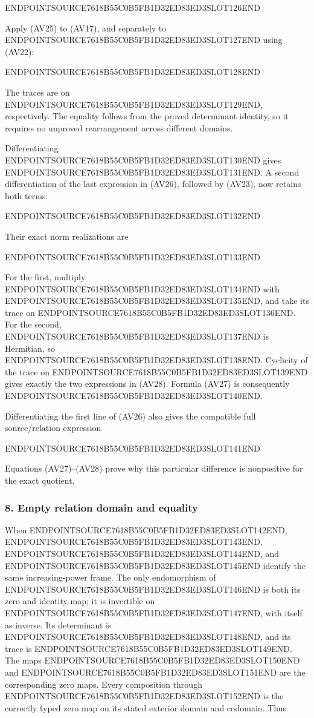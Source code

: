 ENDPOINTSOURCE7618B55C0B5FB1D32ED83ED3SLOT126END

Apply (AV25) to (AV17), and separately to ENDPOINTSOURCE7618B55C0B5FB1D32ED83ED3SLOT127END using (AV22):

ENDPOINTSOURCE7618B55C0B5FB1D32ED83ED3SLOT128END

The traces are on ENDPOINTSOURCE7618B55C0B5FB1D32ED83ED3SLOT129END, respectively. The equality follows from the proved determinant identity, so it requires no unproved rearrangement across different domains.

Differentiating ENDPOINTSOURCE7618B55C0B5FB1D32ED83ED3SLOT130END gives ENDPOINTSOURCE7618B55C0B5FB1D32ED83ED3SLOT131END. A second differentiation of the last expression in (AV26), followed by (AV23), now retains both terms:

ENDPOINTSOURCE7618B55C0B5FB1D32ED83ED3SLOT132END

Their exact norm realizations are

ENDPOINTSOURCE7618B55C0B5FB1D32ED83ED3SLOT133END

For the first, multiply ENDPOINTSOURCE7618B55C0B5FB1D32ED83ED3SLOT134END with ENDPOINTSOURCE7618B55C0B5FB1D32ED83ED3SLOT135END, and take its trace on ENDPOINTSOURCE7618B55C0B5FB1D32ED83ED3SLOT136END. For the second, ENDPOINTSOURCE7618B55C0B5FB1D32ED83ED3SLOT137END is Hermitian, so ENDPOINTSOURCE7618B55C0B5FB1D32ED83ED3SLOT138END. Cyclicity of the trace on ENDPOINTSOURCE7618B55C0B5FB1D32ED83ED3SLOT139END gives exactly the two expressions in (AV28). Formula (AV27) is consequently ENDPOINTSOURCE7618B55C0B5FB1D32ED83ED3SLOT140END.

Differentiating the first line of (AV26) also gives the compatible full source/relation expression

ENDPOINTSOURCE7618B55C0B5FB1D32ED83ED3SLOT141END

Equations (AV27)--(AV28) prove why this particular difference is nonpositive for the exact quotient.

\subsubsection{8. Empty relation domain and equality}\label{endpoint-variation_review--empty-relation-domain-and-equality}

When ENDPOINTSOURCE7618B55C0B5FB1D32ED83ED3SLOT142END, ENDPOINTSOURCE7618B55C0B5FB1D32ED83ED3SLOT143END, ENDPOINTSOURCE7618B55C0B5FB1D32ED83ED3SLOT144END, and ENDPOINTSOURCE7618B55C0B5FB1D32ED83ED3SLOT145END identify the same increasing-power frame. The only endomorphism of ENDPOINTSOURCE7618B55C0B5FB1D32ED83ED3SLOT146END is both its zero and identity map; it is invertible on ENDPOINTSOURCE7618B55C0B5FB1D32ED83ED3SLOT147END, with itself as inverse. Its determinant is ENDPOINTSOURCE7618B55C0B5FB1D32ED83ED3SLOT148END, and its trace is ENDPOINTSOURCE7618B55C0B5FB1D32ED83ED3SLOT149END. The maps ENDPOINTSOURCE7618B55C0B5FB1D32ED83ED3SLOT150END and ENDPOINTSOURCE7618B55C0B5FB1D32ED83ED3SLOT151END are the corresponding zero maps. Every composition through ENDPOINTSOURCE7618B55C0B5FB1D32ED83ED3SLOT152END is the correctly typed zero map on its stated exterior domain and codomain. Thus

